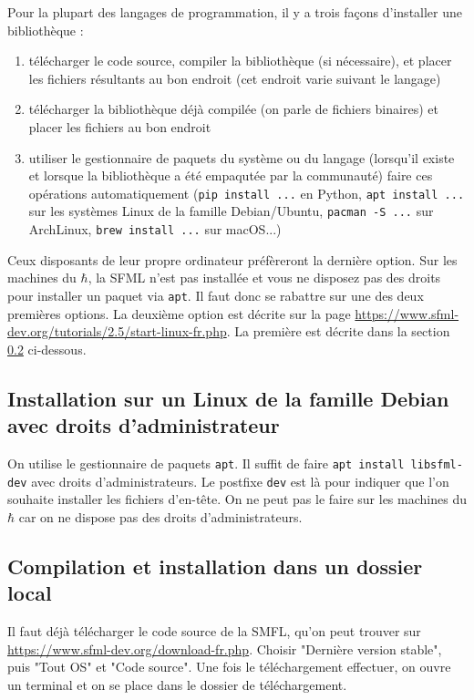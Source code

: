 \documentclass{book}
\begin{document}
Pour la plupart des langages de programmation, il y a trois façons d'installer une bibliothèque :
\begin{enumerate}
  \item télécharger le code source, compiler la bibliothèque (si nécessaire), et placer les fichiers résultants au bon endroit (cet endroit varie suivant le langage)
  \item télécharger la bibliothèque déjà compilée (on parle de fichiers binaires) et placer les fichiers au bon endroit
  \item utiliser le gestionnaire de paquets du système ou du langage (lorsqu'il existe et lorsque la bibliothèque a été empaqutée par la communauté) faire ces opérations automatiquement (\texttt{pip install ...} en Python, \texttt{apt install ...} sur les systèmes Linux de la famille Debian/Ubuntu, \texttt{pacman -S ...} sur ArchLinux, \texttt{brew install ...} sur macOS...)
\end{enumerate}

Ceux disposants de leur propre ordinateur préfèreront la dernière option. Sur les machines du $\hbar$, la SFML n'est pas installée et vous ne disposez pas des droits pour installer un paquet via \texttt{apt}. Il faut donc se rabattre sur une des deux premières options. La deuxième option est décrite sur la page \url{https://www.sfml-dev.org/tutorials/2.5/start-linux-fr.php}. La première est décrite dans la section \ref{sec:Compilation et installation dans un dossier local} ci-dessous.

\subsection{Installation sur un Linux de la famille Debian avec droits d'administrateur}

On utilise le gestionnaire de paquets \texttt{apt}. Il suffit de faire \texttt{apt install libsfml-dev} avec droits d'administrateurs. Le postfixe \texttt{dev} est là pour indiquer que l'on souhaite installer les fichiers d'en-tête. On ne peut pas le faire sur les machines du $\hbar$ car on ne dispose pas des droits d'administrateurs.

\subsection{Compilation et installation dans un dossier local}
\label{sec:Compilation et installation dans un dossier local}

Il faut déjà télécharger le code source de la SMFL, qu'on peut trouver sur \url{https://www.sfml-dev.org/download-fr.php}. Choisir "Dernière version stable", puis "Tout OS" et "Code source". Une fois le téléchargement effectuer, on ouvre un terminal et on se place dans le dossier de téléchargement.
\end{document}
